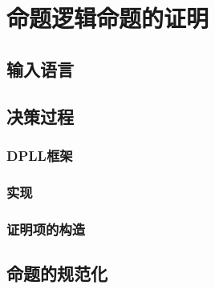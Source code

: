 \chapter{命题逻辑命题的证明}
\label{chap:sat}

\section{输入语言}

\section{决策过程}
\subsection{DPLL框架}
\subsection{实现}
\subsection{证明项的构造}

\section{命题的规范化}
